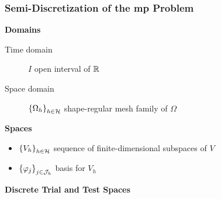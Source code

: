 \begin{frame}
    \frametitle{Semi-Discretization of the \acrshort{mp} Problem}

    \vspace*{\fill}
    \begin{multicols}{2}
        
        \begin{center}
            {\color{\accentcolor} \Large \textbf{Domains}}
            \vspace*{0.5cm}

            \begin{minipage}{0.4\textwidth}
                \begin{description}
                    \item[Time domain] $I$ open interval of $\mathbb{R}$
                    \item[Space domain] $\left\{ \Omega_{h} \right\}_{h \in \mathcal{H}}$ shape-regular mesh family of $\Omega$
                \end{description}
            \end{minipage}
        \end{center}

        \vfill\null
        \columnbreak

        \begin{center}
            {\color{\accentcolor} \Large \textbf{Spaces}}
            \vspace*{0.5cm}

            \begin{minipage}{0.4\textwidth}
                \begin{itemize}
                    \item $\left\{ V_h \right\}_{h \in \mathcal{H}}$ sequence of finite-dimensional subspaces of $V$
                    \item $\left\{ \varphi_j \right\}_{j \in \mathcal{J}_h}$ basis for $V_h$
                \end{itemize}
            \end{minipage}
        \end{center}

    \end{multicols}

    \vspace*{\fill}

    \begin{center}
        {\color{\accentcolor} \Large \textbf{Discrete Trial and Test Spaces}}
        \vspace*{0.25cm}


\end{center}
\end{frame}
